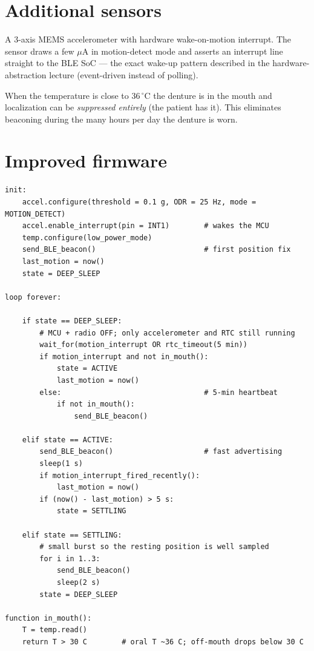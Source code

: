 \documentclass[11pt,a4paper]{article}
\begin{document}
\section{Additional sensors}

\begin{description}[font=\sffamily\bfseries\color{slate}]
\item[Accelerometer (mandatory).]
A 3-axis MEMS accelerometer with hardware wake-on-motion interrupt.
The sensor draws a few $\mu$A in motion-detect mode and asserts an
interrupt line straight to the BLE SoC — the exact wake-up pattern
described in the hardware-abstraction lecture (event-driven instead of
polling).

\item[Body-contact thermistor (optional, recommended).]
When the temperature is close to $36\,^\circ$C the denture is in the
mouth and localization can be \emph{suppressed entirely} (the patient
has it). This eliminates beaconing during the many hours per day the
denture is worn.
\end{description}

\section{Improved firmware}

\begin{lstlisting}[style=pseudo]
init:
    accel.configure(threshold = 0.1 g, ODR = 25 Hz, mode = MOTION_DETECT)
    accel.enable_interrupt(pin = INT1)        # wakes the MCU
    temp.configure(low_power_mode)
    send_BLE_beacon()                         # first position fix
    last_motion = now()
    state = DEEP_SLEEP

loop forever:

    if state == DEEP_SLEEP:
        # MCU + radio OFF; only accelerometer and RTC still running
        wait_for(motion_interrupt OR rtc_timeout(5 min))
        if motion_interrupt and not in_mouth():
            state = ACTIVE
            last_motion = now()
        else:                                 # 5-min heartbeat
            if not in_mouth():
                send_BLE_beacon()

    elif state == ACTIVE:
        send_BLE_beacon()                     # fast advertising
        sleep(1 s)
        if motion_interrupt_fired_recently():
            last_motion = now()
        if (now() - last_motion) > 5 s:
            state = SETTLING

    elif state == SETTLING:
        # small burst so the resting position is well sampled
        for i in 1..3:
            send_BLE_beacon()
            sleep(2 s)
        state = DEEP_SLEEP

function in_mouth():
    T = temp.read()
    return T > 30 C        # oral T ~36 C; off-mouth drops below 30 C
\end{lstlisting}
\end{document}
